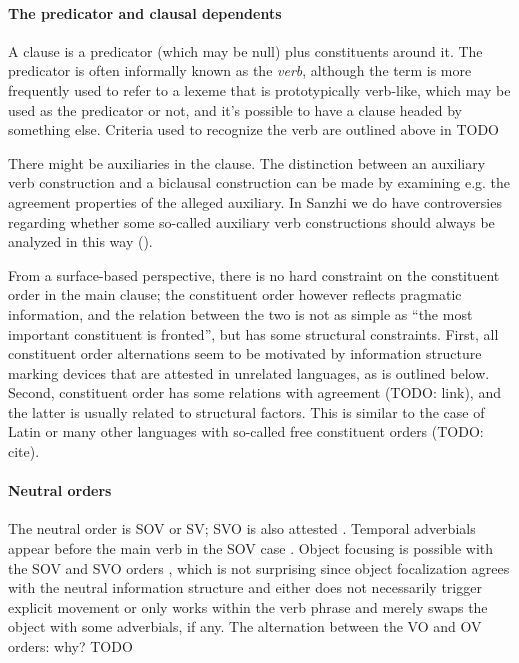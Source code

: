 \documentclass[a4paper, oneside, 12pt]{report}
\newcommand*{\citetable}[1]{Table~{#1}}
\newcommand*{\citepage}[1]{p.~{#1}}
\newcommand*{\citepages}[1]{pp.~{#1}}
\begin{document}
\paragraph*{The predicator and clausal dependents} 
A clause is a predicator (which may be null) plus constituents around it.
The predicator is often informally known as the \emph{verb}, 
although the term is more frequently used to refer to a lexeme that is prototypically verb-like, 
which may be used as the predicator or not, 
and it's possible to have a clause headed by something else. 
Criteria used to recognize the verb are outlined above in TODO 

There might be auxiliaries in the clause.
The distinction between an auxiliary verb construction 
and a biclausal construction 
can be made by examining e.g. the agreement properties of the alleged auxiliary.
In Sanzhi we do have controversies regarding whether some so-called auxiliary verb constructions 
should always be analyzed in this way
(). 

From a surface-based perspective, 
there is no hard constraint on the constituent order in the main clause;
the constituent order however reflects pragmatic information,
and the relation between the two is not as simple as 
``the most important constituent is fronted'',
but has some structural constraints.
First, all constituent order alternations seem to be motivated by 
information structure marking devices that are attested in unrelated languages, 
as is outlined below.
Second, constituent order has some relations with agreement (TODO: link), 
and the latter is usually related to structural factors. 
This is similar to the case of Latin or many other 
languages with so-called free constituent orders (TODO: cite).

\paragraph*{Neutral orders}
The neutral order is SOV or SV; SVO is also attested
\citep[\citetable{27.1}]{forker2020grammar}.
Temporal adverbials appear before the main verb in the SOV case 
\citep[\citepage{520}, (30)]{forker2020grammar}.
Object focusing is possible with the SOV and SVO orders
\citep[\citepages{520-521}]{forker2020grammar}, 
which is not surprising since object focalization agrees with the neutral information structure 
and either does not necessarily trigger explicit movement
or only works within the verb phrase and merely swaps the object with some adverbials, if any.
The alternation between the VO and OV orders: why? TODO
\end{document}
